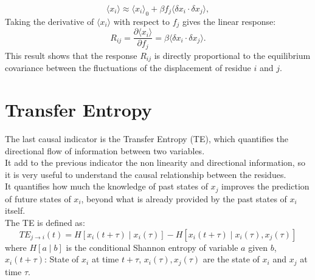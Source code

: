 \documentclass[English, Lau, oneside]{sapthesis}
\begin{document}
\begin{equation}
\langle {x}_i \rangle \approx \langle {x}_i \rangle_0 + \beta f_j \langle \delta {x}_i \cdot \delta {x}_j \rangle,
\end{equation}
Taking the derivative of $\langle {x}_i \rangle$ with respect to $f_j$ gives the linear response:
\begin{equation}
R_{ij} = \frac{\partial \langle {x}_i \rangle}{\partial f_j} = \beta \langle \delta {x}_i \cdot \delta {x}_j \rangle. \label{response}
\end{equation}
This result shows that the response $R_{ij}$ is directly proportional to the equilibrium covariance between the fluctuations of the displacement of residue $i$ and $j$.\\

\newpage
\section{Transfer Entropy}
\noindent The last causal indicator is the Transfer Entropy (TE), which quantifies the directional flow of information between two variables.\\
It add to the previous indicator the non linearity and directional information, so it is very useful to understand the causal relationship between the residues.\\
It quantifies how much the knowledge of past states of \(x_j\) improves the prediction of future states of \(x_i\), beyond what is already provided by the past states of \(x_i\) itself. \\
The TE is defined as:\cite{ref13}
\[
TE_{j \to i}(t) = H[x_i(t + \tau) \mid x_i(\tau)] - H[x_i(t + \tau) \mid x_i(\tau), x_j(\tau)]
\]
where \(H[a \mid b]\) is the conditional Shannon entropy of variable \(a\) given \(b\), \(x_i(t + \tau)\): 
State of \(x_i\) at time \(t + \tau\), \(x_i(\tau), x_j(\tau)\) are the state of \(x_i\) and \(x_j\) at time \(\tau\).\\
\end{document}
